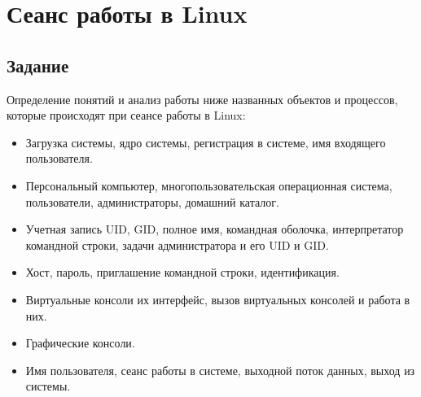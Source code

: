 \chapter{Сеанс работы в Linux}

\section{Задание}
	Определение понятий и анализ работы ниже названных объектов и процессов, которые происходят при сеансе работы в Linux:
\begin{itemize}
	\item Загрузка системы, ядро ​​системы, регистрация в системе, имя входящего пользователя.
	\item Персональный компьютер, многопользовательская операционная система, 					пользователи, администраторы, домашний каталог.
	\item Учетная запись UID, GID, полное имя, командная оболочка, интерпретатор командной 	строки, задачи администратора и его UID и GID.
	\item Хост, пароль, приглашение командной строки, идентификация.
	\item Виртуальные консоли их интерфейс, вызов виртуальных консолей и работа в них.
	\item Графические консоли.
	\item Имя пользователя, сеанс работы в системе, выходной поток данных, выход из 			системы.
\end{itemize}
